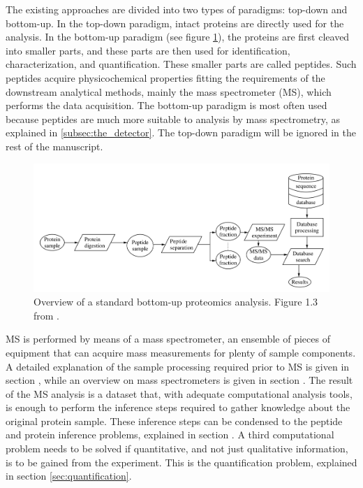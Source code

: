 \documentclass[11pt, a4paper]{report}
\begin{document}
The existing approaches are divided into two types of paradigms: top-down and bottom-up. In the top-down paradigm, intact proteins are directly used for the analysis. In the bottom-up paradigm (see figure \ref{fig:proteomics_overview}), the proteins are first cleaved into smaller parts, and these parts are then used for identification, characterization, and quantification. These smaller parts are called peptides. \cite{Barsnes2008}  Such peptides acquire physicochemical properties fitting the requirements of the downstream analytical methods, mainly the mass spectrometer (MS), which performs the data acquisition. The bottom-up paradigm is most often used because peptides are much more suitable to analysis by mass spectrometry, as explained in \ref{subsec:the_detector}. The top-down paradigm will be ignored in the rest of the manuscript.

\begin{figure}[!h]
\includegraphics[width=\textwidth]{proteomics_skema_book}
\caption{Overview of a standard bottom-up proteomics analysis. Figure 1.3 from \cite{Barsnes2008}.}
\label{fig:proteomics_overview}
\end{figure}

MS is performed by means of a mass spectrometer, an ensemble of pieces of equipment that can acquire mass measurements for plenty of sample components. A detailed explanation of the sample processing required prior to MS is given in section \label{sec:sample processing}, while an overview on mass spectrometers is given in section \label{sec:the mass spectrometer}. The result of the MS analysis is a dataset that, with adequate computational analysis tools, is enough to perform the inference steps required to gather knowledge about the original protein sample. These inference steps can be condensed to the peptide and protein inference problems, explained in section \label{sec:peptide and protein inference}. A third computational problem needs to be solved if quantitative, and not just qualitative information, is to be gained from the experiment. This is the quantification problem, explained in section \ref{sec:quantification}.
\end{document}
